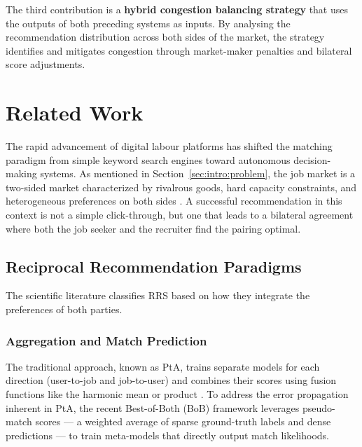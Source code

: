 The third contribution is a \textbf{hybrid congestion balancing strategy} that uses the outputs of both preceding systems as inputs. By analysing the recommendation distribution across both sides of the market, the strategy identifies and mitigates congestion through market-maker penalties and bilateral score adjustments. 

\section{Related Work}
\label{sec:prelim_related_work}

The rapid advancement of digital labour platforms has shifted the matching paradigm from simple keyword search engines toward autonomous decision-making systems. As mentioned in Section~\ref{sec:intro:problem}, the job market is a two-sided market characterized by rivalrous goods, hard capacity constraints, and heterogeneous preferences on both sides \cite{goda2024bestofbothapproachimprovematch, mashayekhi2023reconreducingcongestionjob}. A successful recommendation in this context is not a simple click-through, but one that leads to a bilateral agreement where both the job seeker and the recruiter find the pairing optimal.

\subsection{Reciprocal Recommendation Paradigms}
The scientific literature classifies \gls{RRS} based on how they integrate the preferences of both parties. 

\subsubsection{Aggregation and Match Prediction}
The traditional approach, known as \gls{PtA}, trains separate models for each direction (user-to-job and job-to-user) and combines their scores using fusion functions like the harmonic mean or product \cite{goda2024bestofbothapproachimprovematch}. To address the error propagation inherent in \gls{PtA}, the recent Best-of-Both (BoB) framework leverages pseudo-match scores --- a weighted average of sparse ground-truth labels and dense predictions --- to train meta-models that directly output match likelihoods.

